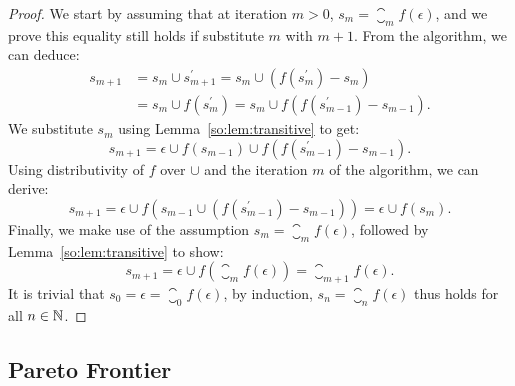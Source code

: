 \begin{proof}
    We start by assuming that at iteration $m > 0$, $s_m = \closure_m
    f(\epsilon)$, and we prove this equality still holds if substitute $m$ with
    $m + 1$.  From the algorithm, we can deduce:
    \begin{equation*}
    \begin{aligned}
        s_{m+1}
        &= s_m \cup s^\prime_{m+1}
         = s_m \cup \left( f \left( s^\prime_m \right) - s_m \right) \\
        &= s_m \cup f \left( s^\prime_m \right)
         = s_m \cup f \left(
                f \left( s^\prime_{m-1} \right) - s_{m-1}
            \right).
    \end{aligned}
    \end{equation*}
    We substitute $s_m$ using Lemma~\ref{so:lem:transitive} to get:
    \begin{equation*}
        s_{m+1}
          = \epsilon \cup f \left( s_{m-1} \right) \cup
            f \left(
                f \left( s^\prime_{m-1} \right) - s_{m-1}
            \right).
    \end{equation*}
    Using distributivity of $f$ over $\cup$ and the iteration $m$ of the
    algorithm, we can derive:
    \begin{equation*}
        s_{m+1}
         = \epsilon \cup f \left(
                s_{m-1} \cup \left(
                    f \left( s^\prime_{m-1} \right) - s_{m-1}
                \right)
            \right)
         = \epsilon \cup f \left( s_m \right).
    \end{equation*}
    Finally, we make use of the assumption $s_m = \closure_m f(\epsilon)$,
    followed by Lemma~\ref{so:lem:transitive} to show:
    \begin{equation*}
        s_{m+1}
        = \epsilon \cup f \left(
            \closure_m f(\epsilon)
        \right)
        = \closure_{m+1} f(\epsilon).
    \end{equation*}
    It is trivial that $s_0 = \epsilon = \closure_0 f(\epsilon)$, by induction,
    $s_n = \closure_n f(\epsilon)$ thus holds for all $n \in \mathbb{N}$.
\end{proof}


\subsection{Pareto Frontier}

